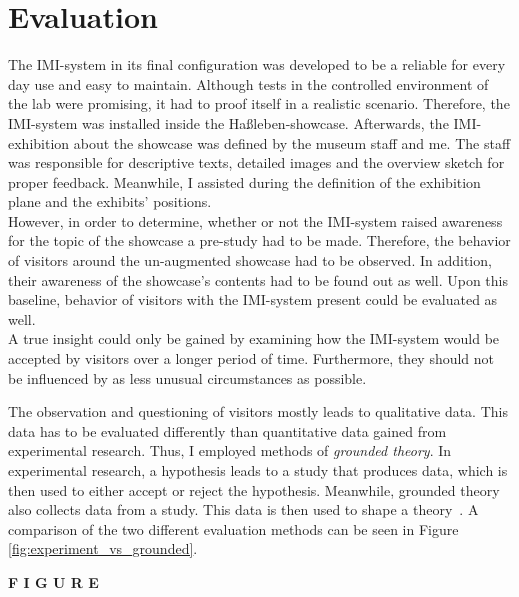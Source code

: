 \chapter{Evaluation}
\label{evaluation}

The \ac{IMI}-system in its final configuration was developed to be a reliable for every day use and easy to maintain. Although tests in the controlled environment of the lab were promising, it had to proof itself in a realistic scenario. Therefore, the \ac{IMI}-system was installed inside the Haßleben-showcase. Afterwards, the \ac{IMI}-exhibition about the showcase was defined by the museum staff and me. The staff was responsible for descriptive texts, detailed images and the overview sketch for proper feedback. Meanwhile, I assisted during the definition of the exhibition plane and the exhibits' positions.
\\
However, in order to determine, whether or not the \ac{IMI}-system raised awareness for the topic of the showcase a pre-study had to be made. Therefore, the behavior of visitors around the un-augmented showcase had to be observed. In addition, their awareness of the showcase's contents had to be found out as well. Upon this baseline, behavior of visitors with the \ac{IMI}-system present could be evaluated as well.
\\
A true insight could only be gained by examining how the \ac{IMI}-system would be accepted by visitors over a longer period of time. Furthermore, they should not be influenced by as less unusual circumstances as possible.

The observation and questioning of visitors mostly leads to qualitative data. This data has to be evaluated differently than quantitative data gained from experimental research. Thus, I employed methods of \textit{grounded theory}. In experimental research, a hypothesis leads to a study that produces data, which is then used to either accept or reject the hypothesis. Meanwhile, grounded theory also collects data from a study. This data is then used to shape a theory~\cite{GroundedTheory}. A comparison of the two different evaluation methods can be seen in Figure \ref{fig:experiment_vs_grounded}.

\textbf{F I G U R E}
 
